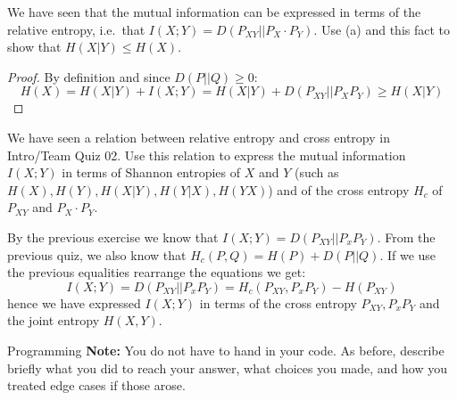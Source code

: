 \documentclass[a4paper,10pt]{article}
\begin{document}
\begin{subproblem}{1}
We have seen that the mutual information can be expressed in
        terms of the relative entropy, i.e.\ that $I(X;Y) =
        D(P_{XY}||P_X \cdot P_Y)$. Use (a) and this fact to show that $H(X|Y) \leq H(X)$.
\end{subproblem}

\begin{solution}
  \begin{proof}
    By definition and since $D(P||Q)\ge 0$:
    \begin{equation}
      \label{eq:6}
      H(X) = H(X|Y) + I(X;Y) = H(X|Y) + D(P_{XY}||P_{X}P_{Y}) \ge H(X|Y)
    \end{equation}
  \end{proof}
\end{solution}

\begin{subproblem}{2}
We have seen a relation between relative entropy and cross
        entropy in Intro/Team Quiz 02. Use this relation to express
        the mutual information $I(X;Y)$ in terms of Shannon entropies
        of $X$ and $Y$ (such as $H(X), H(Y), H(X|Y), H(Y|X), H(YX)$) and of the cross entropy $H_c$ of $P_{XY}$ and $P_X
        \cdot P_Y$.
\end{subproblem}

\begin{solution}

  By the previous exercise we know that $I(X;Y) = D(P_{XY} || P_{x}P_{Y})$.
  From the previous quiz, we also know that $H_{c}(P, Q) = H(P) + D(P||Q)$.
  If we use the previous equalities rearrange the equations we get:
  \begin{equation}
    \label{eq:7}
    I(X;Y) = D(P_{XY} || P_{x}P_{Y}) = H_{c}(P_{XY}, P_{x}P_{Y}) - H(P_{XY})
  \end{equation}
  hence we have expressed $I(X;Y)$ in terms of the cross entropy $P_{XY},
  P_{x}P_{Y}$ and the joint entropy $H(X,Y)$.
\end{solution}









\begin{nproblem}{8}{Programming}
	\textbf{Note:} You do not have to hand in your code. As before, describe briefly what you did to reach your answer, what choices you made, and how you treated edge cases if those arose.
\end{nproblem}
\end{document}
